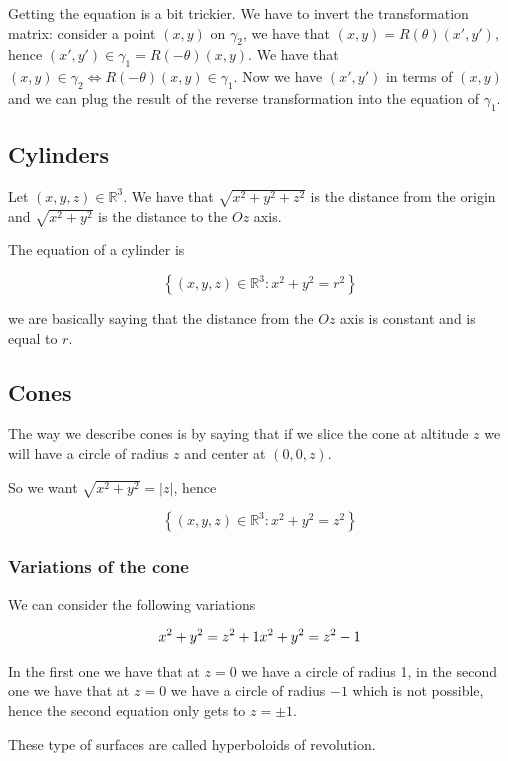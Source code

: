 \documentclass[10pt]{extarticle}
\newcommand{\R}{\mathbb{R}}
\begin{document}
Getting the equation is a bit trickier.
We have to invert the transformation matrix:
consider a point $(x, y)$ on $\gamma_2$, we have that $(x, y) = R(\theta) (x', y')$, hence $(x', y') \in \gamma_1 = R(-\theta) (x, y)$.
We have that $(x,y) \in \gamma_2 \iff R(-\theta)(x, y) \in \gamma_1$.
Now we have $(x', y')$ in terms of $(x, y)$ and we can plug the result of the reverse transformation into the equation of $\gamma_1$.

\subsection{Cylinders}

Let $(x, y, z) \in \R^3$. We have that $\sqrt{x^2 + y^2 + z^2}$ is the distance from the origin and $\sqrt{x^2 + y^2}$ is the distance to the $Oz$ axis.

The equation of a cylinder is

$$
    \left\{ (x, y, z) \in \R^3  : x^2 + y^2 = r^2\right\}
$$

we are basically saying that the distance from the $Oz$ axis is constant and is equal to $r$.

\subsection{Cones}

The way we describe cones is by saying that if we slice the cone at altitude $z$ we will have a circle of radius $z$ and center at $(0,0,z)$.

So we want $\sqrt{x^2 + y^2} = |z|$, hence

$$
    \left\{ (x, y, z) \in \R^3 : x^2 + y^2 = z^2 \right\}
$$

\subsubsection{Variations of the cone}

We can consider the following variations

$$
    x^2 + y^2 = z^2 + 1 \\
    x^2 + y^2 = z^2 - 1
$$

In the first one we have that at $z=0$ we have a circle of radius 1, in the second one we have that at $z=0$ we have a circle of radius $-1$ which is not possible, hence the second equation only gets to $z = \pm 1$.

These type of surfaces are called hyperboloids of revolution.
\end{document}
